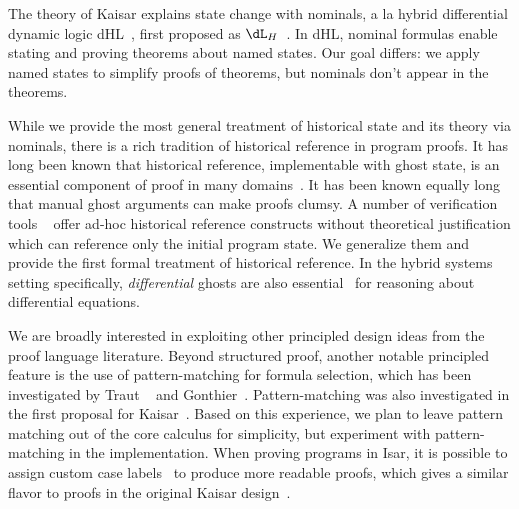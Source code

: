 \documentclass[12pt]{cmuthesis}
\theoremstyle{definition}
\theoremstyle{remark}
\newcommand{\dLN}{\ensuremath{\dL_H}}
\newcommand{\dHL}{\textsf{dHL}\xspace}
\begin{document}
The theory of Kaisar explains state change with nominals, a la hybrid differential dynamic logic \dHL~\cite{DBLP:conf/lics/BohrerP18}, first proposed as \dLN~\cite{DBLP:journals/entcs/Platzer07}.
In \dHL, nominal formulas enable stating and proving theorems about named states.
Our goal differs: we apply named states to simplify proofs of theorems, but nominals don't appear in the theorems.

While we provide the most general treatment of historical state and its theory via nominals, there is a rich tradition of historical reference in program proofs.
It has long been known that historical reference, implementable with ghost state, is an essential component of proof in many domains~\cite{DBLP:journals/tcs/AptBM79,Owicki1976,DBLP:books/garland/Owicki75,apt2010verification,DBLP:journals/acta/Clint73}.
It has been known equally long~\cite{DBLP:journals/acta/Clarke80} that manual ghost arguments can make proofs clumsy.
A number of verification tools ~\cite{DBLP:series/lncs/10001,DBLP:conf/cade/FultonMQVP15,DBLP:conf/lpar/Leino10,this-is-boogie-2-2,Barnett2005,DBLP:conf/fosad/LeinoMS09,DBLP:books/daglib/p/LeavensBR99,DBLP:journals/fac/Kleymann99} offer ad-hoc historical reference constructs without theoretical justification which can reference only the initial program state.
We generalize them and provide the first formal treatment of historical reference.
In the hybrid systems setting specifically, \emph{differential} ghosts are also essential~\cite{DBLP:conf/lics/PlatzerT18} for reasoning about differential equations.


We are broadly interested in exploiting other principled design ideas from the proof language literature.
Beyond structured proof, another notable principled feature is the use of pattern-matching for formula selection, which has been investigated by Traut ~\cite{traut2014pattern} and Gonthier~\cite{DBLP:conf/itp/GonthierT12}.
Pattern-matching was also investigated in the first proposal for Kaisar~\cite{DBLP:journals/corr/abs-1908-05535}.
Based on this experience, we plan to leave pattern matching out of the core calculus for simplicity, but experiment with pattern-matching in the implementation.
When proving programs in Isar, it is possible to assign custom case labels~\cite{DBLP:journals/afp/Noschinski15} to produce more readable proofs, which gives a similar flavor to proofs in the original Kaisar design~\cite{DBLP:journals/corr/abs-1908-05535}.
\end{document}
